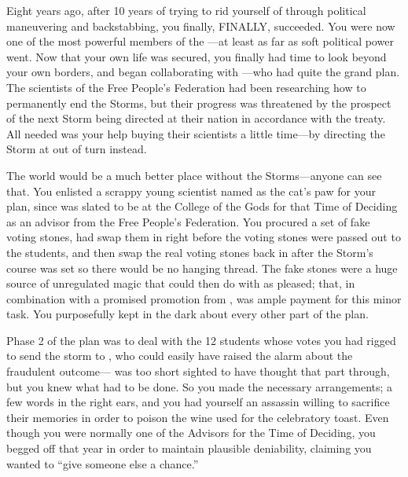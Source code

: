 \documentclass[char]{GL2020}
\begin{document}
Eight years ago, after 10 years of trying to rid yourself of \cEvilNemesis{} through political maneuvering and backstabbing, you finally, FINALLY, succeeded. You were now one of the most powerful members of the \pFarm{}---at least as far as soft political power went. Now that your own life was secured, you finally had time to look beyond your own borders, and began collaborating with \cDiplomat{\full}---who had quite the grand plan. The scientists of the Free People's Federation had been researching how to permanently end the Storms, but their progress was threatened by the prospect of the next Storm being directed at their nation in accordance with the treaty. All \cDiplomat{} needed was your help buying their scientists a little time---by directing the Storm at \pShip{} out of turn instead. 

The world would be a much better place without the Storms---anyone can see that. You enlisted a scrappy young scientist named \cHeadScientist{\full} as the cat's paw for your plan, since \cHeadScientist{\they} was slated to be at the College of the Gods for that Time of Deciding as an advisor from the Free People's Federation. You procured a set of fake voting stones, had  \cHeadScientist{} swap them in right before the voting stones were passed out to the students, and then swap the real voting stones back in after the Storm's course was set so there would be no hanging thread. The fake stones were a huge source of unregulated magic that \cHeadScientist{} could then do with as \cHeadScientist{\they} pleased; that, in combination with a promised promotion from \cDiplomat{}, was ample payment for this minor task. You purposefully kept \cHeadScientist{} in the dark about every other part of the plan. 

Phase 2 of the plan was to deal with the 12 students whose votes you had rigged to send the storm to \pShip{}, who could easily have raised the alarm about the fraudulent outcome---\cDiplomat{} was too short sighted to have thought that part through, but you knew what had to be done. So you made the necessary arrangements; a few words in the right ears, and you had yourself an assassin willing to sacrifice their memories in order to poison the wine used for the celebratory toast. Even though you were normally one of the Advisors for the Time of Deciding, you begged off that year in order to maintain plausible deniability, claiming you wanted to ``give someone else a chance.'' 
\end{document}
